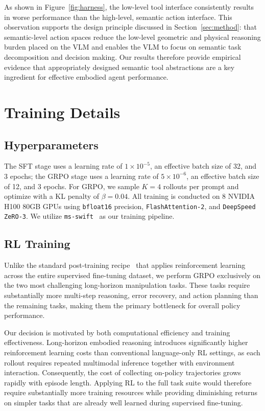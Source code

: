 As shown in Figure~\ref{fig:harness}, the low-level tool interface consistently results in worse performance than the high-level, semantic action interface. This observation supports the design principle discussed in Section~\ref{sec:method}: that semantic-level action spaces reduce the low-level geometric and physical reasoning burden placed on the VLM and enables the VLM to focus on semantic task decomposition and decision making. Our results therefore provide empirical evidence that appropriately designed semantic tool abstractions are a key ingredient for effective embodied agent performance.


\section{Training Details}
\subsection{Hyperparameters}
The SFT stage uses a learning rate of $1\times10^{-5}$, an effective batch size of 32, and 3 epochs; the GRPO stage uses a learning rate of $5\times10^{-6}$, an effective batch size of 12, and 3 epochs.
For GRPO, we sample $K=4$ rollouts per prompt and optimize with a KL penalty of $\beta=0.04$. 
All training is conducted on 8 NVIDIA H100 80GB GPUs using \texttt{bfloat16} precision, \texttt{FlashAttention-2}, and \texttt{DeepSpeed ZeRO-3}. We utilize \texttt{ms-swift}~\citep{msswift2025} as our training pipeline.

\subsection{RL Training}

Unlike the standard post-training recipe~\citep{zhou2025r1zerosahamomentvisual, shao2024deepseekmathpushinglimitsmathematical} that applies reinforcement learning across the entire supervised fine-tuning dataset, we perform GRPO exclusively on the two most challenging long-horizon manipulation tasks. These tasks require substantially more multi-step reasoning, error recovery, and action planning than the remaining tasks, making them the primary bottleneck for overall policy performance.

Our decision is motivated by both computational efficiency and training effectiveness. Long-horizon embodied reasoning introduces significantly higher reinforcement learning costs than conventional language-only RL settings, as each rollout requires repeated multimodal inference together with environment interaction. Consequently, the cost of collecting on-policy trajectories grows rapidly with episode length. Applying RL to the full task suite would therefore require substantially more training resources while providing diminishing returns on simpler tasks that are already well learned during supervised fine-tuning.


